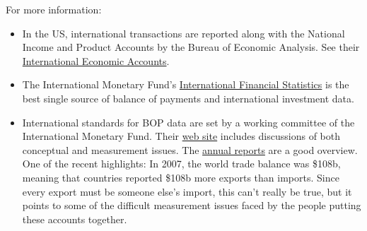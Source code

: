 For more information:
%
\begin{itemize}
\item In the US, international transactions are reported along with the National Income and
Product Accounts by the Bureau of Economic Analysis.  See their
\href{http://www.bea.gov/bea/di1.htm}{International Economic Accounts}.

\item The International Monetary Fund's
\href{http://ifs.apdi.net/imf/ifsbrowser.aspx?branch=ROOT}{International Financial Statistics} is
the best single source of balance of payments and international investment data.

\item International standards for BOP data are set by a working committee of the International
Monetary Fund.  Their \href{http://www.imf.org/external/np/sta/bop/bop.htm}{web site} includes
discussions of both conceptual and measurement issues. The
\href{http://www.imf.org/external/bopage/arindex.htm}{annual reports} are a good overview.  One of
the recent highlights:  In 2007, the world trade balance was \$108b, meaning that countries
reported \$108b more exports than imports.  Since every export must be someone else's import, this
can't really be true, but it points to some of the difficult measurement issues faced by the
people putting these accounts together.

\end{itemize}


